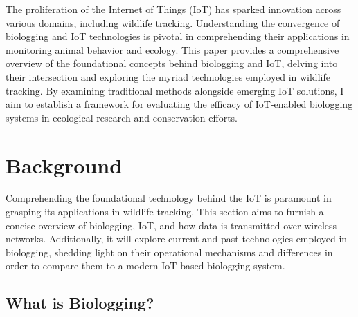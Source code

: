 \documentclass[sigplan,screen,nonacm]{acmart}
\begin{document}
The proliferation of the Internet of Things (IoT) has sparked innovation across various domains, including 
wildlife tracking. Understanding the convergence of biologging and IoT technologies is pivotal in comprehending 
their applications in monitoring animal behavior and ecology. This paper provides a comprehensive overview of 
the foundational concepts behind biologging and IoT, delving into their intersection and exploring the myriad 
technologies employed in wildlife tracking. By examining traditional methods alongside emerging IoT solutions, 
I aim to establish a framework for evaluating the efficacy of IoT-enabled biologging systems in ecological 
research and conservation efforts.

\section{Background}
\label{sec:Background}

Comprehending the foundational technology behind the IoT
is paramount in grasping its applications in wildlife tracking. This section
aims to furnish a concise overview of biologging, IoT, and how data is transmitted 
over wireless networks. Additionally, it will explore current and past
technologies employed in biologging, shedding light on their operational
mechanisms and differences in order to compare them to a modern IoT based biologging 
system.

\subsection{What is Biologging?}
\label{subsec:What is Biologging}
\end{document}
